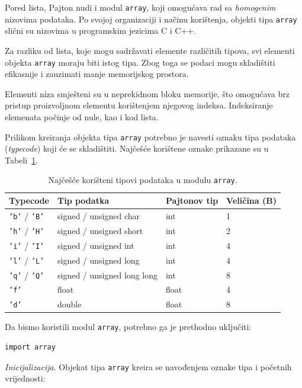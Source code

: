 Pored lista, Pajton nudi i modul \texttt{array}, koji omogućava rad sa \textit{homogenim} nizovima podataka. Po svojoj organizaciji i načinu korištenja, objekti tipa \texttt{array} slični su nizovima u programskim jezicima {C} i {C++}.

Za razliku od lista, koje mogu sadržavati elemente različitih tipova, svi elementi objekta \texttt{array} moraju biti istog tipa. Zbog toga se podaci mogu skladištiti efikasnije i zauzimati manje memorijskog prostora.

Elementi niza smješteni su u neprekidnom bloku memorije, što omogućava brz pristup proizvoljnom elementu korištenjem njegovog indeksa. Indeksiranje elemenata počinje od nule, kao i kod lista.

Prilikom kreiranja objekta tipa \texttt{array} potrebno je navesti oznaku tipa podataka (\textit{typecode}) koji će se skladištiti. Najčešće korištene oznake prikazane su u Tabeli~\ref{tab:TipPodatakaArray}.

\begin{table}[H]
	\caption{Najčešće korišteni tipovi podataka u modulu \texttt{array}.}
	\label{tab:TipPodatakaArray}
	\centering
	\begin{tabular}{llll}
		\hline
		\textbf{Typecode} & \textbf{Tip podatka} & \textbf{Pajtonov tip} & \textbf{Veličina (B)} \\
		\hline
		\texttt{'b'} / \texttt{'B'} & signed / unsigned char & int & 1 \\
		\texttt{'h'} / \texttt{'H'} & signed / unsigned short & int & 2 \\
		\texttt{'i'} / \texttt{'I'} & signed / unsigned int & int & 4 \\
		\texttt{'l'} / \texttt{'L'} & signed / unsigned long & int & 4 \\
		\texttt{'q'} / \texttt{'Q'} & signed / unsigned long long & int & 8 \\
		\texttt{'f'} & float & float & 4 \\
		\texttt{'d'} & double & float & 8 \\
		\hline
	\end{tabular}
\end{table}

Da bismo koristili modul \texttt{array}, potrebno ga je prethodno uključiti:

\begin{verbatim}
import array
\end{verbatim}

\textit{Inicijalizacija}. Objekat tipa \texttt{array} kreira se navođenjem oznake tipa i početnih vrijednosti:

